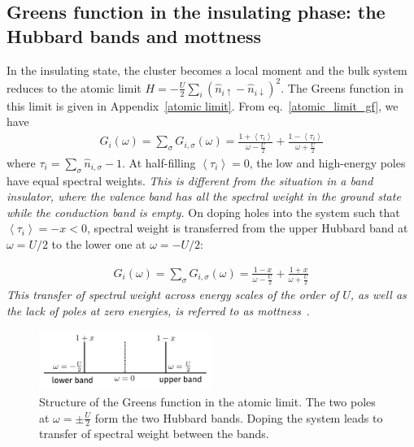 \documentclass[10pt]{report}
\numberwithin{equation}{section}
\begin{document}
\subsection{Greens function in the insulating phase: the Hubbard bands and mottness}
In the insulating state, the cluster becomes a local moment and the bulk system reduces to the atomic limit \(H = -\frac{U}{2}\sum_i\left(\hat n_{i \uparrow} - \hat n_{i \downarrow}\right)^2\). The Greens function in this limit is given in Appendix~\ref{atomic limit}. From eq.~\ref{atomic_limit_gf}, we have
\begin{equation}\begin{aligned}
	G_{i}(\omega) = \sum_\sigma G_{i,\sigma}(\omega) = \frac{1 + \left<\tau_{i }\right>}{\omega - \frac{U}{2}} + \frac{1 - \left<\tau_{i}\right>}{\omega + \frac{U}{2}}
\end{aligned}\end{equation}
where \(\tau_i = \sum_\sigma \hat n_{i,\sigma} - 1\). At half-filling \(\left<\tau_{i}\right>=0\), the low and high-energy poles have equal spectral weights. \textit{This is different from the situation in a band insulator, where the valence band has all the spectral weight in the ground state while the conduction band is empty.} On doping holes into the system such that \(\left<\tau_{i}\right> = -x < 0\), spectral weight is transferred from the upper Hubbard band at \(\omega = U/2\) to the lower one at \(\omega = -U/2\):

\begin{equation}\begin{aligned}
	G_{i}(\omega) = \sum_\sigma G_{i,\sigma}(\omega) = \frac{1 - x}{\omega - \frac{U}{2}} + \frac{1 + x}{\omega + \frac{U}{2}}
\end{aligned}\end{equation}
\textit{This transfer of spectral weight across energy scales of the order of \(U\), as well as the lack of poles at zero energies, is referred to as mottness}~\cite{phillips2006mottness}.
\begin{figure}[!htpb]
	\centering
	\includegraphics[width=0.5\textwidth]{../figures/hubbard_bands.pdf}
	\caption{Structure of the Greens function in the atomic limit. The two poles at \(\omega = \pm \frac{U}{2}\) form the two Hubbard bands. Doping the system leads to transfer of spectral weight between the bands.}
\end{figure}
\end{document}
